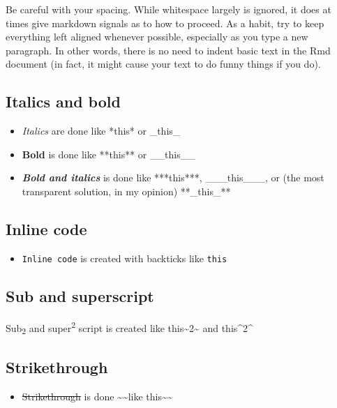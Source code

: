 \documentclass[a4paper, nobind]{templates/ociamthesis}
\providecommand{\tightlist}{%
  \setlength{\itemsep}{0pt}\setlength{\parskip}{0pt}}
\begin{document}
Be careful with your spacing.
While whitespace largely is ignored, it does at times give markdown signals as to how to proceed.
As a habit, try to keep everything left aligned whenever possible, especially as you type a new paragraph.
In other words, there is no need to indent basic text in the Rmd document (in fact, it might cause your text to do funny things if you do).

\hypertarget{italics-and-bold}{%
\subsection{Italics and bold}\label{italics-and-bold}}

\begin{itemize}
\tightlist
\item
  \emph{Italics} are done like *this* or \_this\_
\item
  \textbf{Bold} is done like **this** or \_\_this\_\_
\item
  \textbf{\emph{Bold and italics}} is done like ***this***, \_\_\_this\_\_\_, or (the most transparent solution, in my opinion) **\_this\_**
\end{itemize}

\hypertarget{inline-code}{%
\subsection{Inline code}\label{inline-code}}

\begin{itemize}
\tightlist
\item
  \texttt{Inline\ code} is created with backticks like \texttt{\textasciigrave{}this\textasciigrave{}}
\end{itemize}

\hypertarget{sub-and-superscript}{%
\subsection{Sub and superscript}\label{sub-and-superscript}}

Sub\textsubscript{2} and super\textsuperscript{2} script is created like this\textasciitilde2\textasciitilde{} and this\^{}2\^{}

\hypertarget{strikethrough}{%
\subsection{Strikethrough}\label{strikethrough}}

\begin{itemize}
\tightlist
\item
  \sout{Strikethrough} is done \textasciitilde\textasciitilde like this\textasciitilde\textasciitilde{}
\end{itemize}
\end{document}
